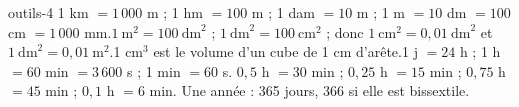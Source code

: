 \begin{blocEdition}{outils-4}
1 km $=1\,000$ m ; 1 hm $=100$ m ; 1 dam $=10$ m ; 1 m $=10$ dm $=100$ cm $=1\,000$ mm.$1\ \mathrm m^2=100\ \mathrm{dm}^2$ ; $1\ \mathrm{dm}^2=100\ \mathrm{cm}^2$ ; donc $1\ \mathrm{cm}^2=0{,}01\ \mathrm{dm}^2$ et $1\ \mathrm{dm}^2=0{,}01\ \mathrm m^2$.1 cm$^3$ est le volume d’un cube de 1 cm d’arête.1 j $=24$ h ; 1 h $=60$ min $=3\,600$ s ; 1 min $=60$ s. $0{,}5$ h $=30$ min ; $0{,}25$ h $=15$ min ; $0{,}75$ h $=45$ min ; $0{,}1$ h $=6$ min. Une année : 365 jours, 366 si elle est bissextile.
\end{blocEdition}

